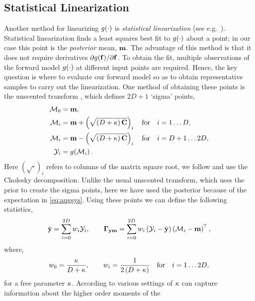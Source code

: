 \documentclass{article} %
\begin{document}
\subsection{Statistical Linearization}
%
Another method for linearizing $g\!\left({{\cdot}}\right)$ is \emph{statistical
    linearization} (see e.g.~\cite{Geist2010}). Statistical linearization finds
a least squares best fit to $g\!\left({{\cdot}}\right)$ about a point; in our case this
point is the \emph{posterior} mean, $\mathbf{m}$. The advantage of this method is
that it does not require derivatives
$\partial g\!\left({{\mathbf{f}}}\right)\!/\partial\mathbf{f}$.  To obtain the fit, multiple
observations of the forward model  $g\!\left({{\cdot}}\right)$ at  different input points
are required. Hence, the key question is where to evaluate our forward model so
as to obtain representative samples to carry out the linearization. 
%
One method of obtaining these points is the unscented transform
\cite{Julier2004}, which defines $2D+1$ `sigma' points,
\begin{align}
    \mathcal{M}_0 &= \mathbf{m},
        \label{eq:spoint0} \\
    \mathcal{M}_i &= \mathbf{m} + \left({\sqrt{\left({D + \kappa}\right) \mathbf{C}}}\right)_i \quad
        \text{for} \quad i = 1 \ldots D, \\
    \mathcal{M}_i &= \mathbf{m} - \left({\sqrt{\left({D + \kappa}\right) \mathbf{C}}}\right)_i \quad
        \text{for} \quad i = D+1 \ldots 2D,
        \label{eq:spointi} \\
    \mathcal{Y}_i &= g\!\left({{\mathcal{M}_i}}\right).
\end{align}
Here $(\sqrt{\cdot})_i$ refers to columns of the matrix square root, we follow
\cite{Julier2004} and use the Cholesky decomposition. Unlike the usual
unscented transform, which uses the prior to create the sigma points, here we
have used the posterior because of the expectation in \eqref{eq:augsys}. Using
these points we can define the following statistics,
\begin{equation}
    \bar{\mathbf{y}} = \sum^{2D}_{i=0} w_i \mathcal{Y}_i,
    \qquad
    \boldsymbol\Gamma_{\mathbf{y}\mathbf{m}} = \sum^{2D}_{i=0} w_i \left({\mathcal{Y}_i - \bar{\mathbf{y}}}\right)
        \left({\mathcal{M}_i - \mathbf{m}}\right)^{\!\top},
    \label{eq:slstats}
\end{equation}
where,
\begin{equation}
    w_0 = \frac{\kappa}{D + \kappa},
        \qquad w_i = \frac{1}{2\left({D + \kappa}\right)}
        \quad \text{for} \quad i = 1 \ldots 2D,
    \label{eq:slweights}
\end{equation}
for a free parameter $\kappa$. According to \cite{Julier2004} various settings
of $\kappa$ can capture information about the higher order moments of the
\end{document}
